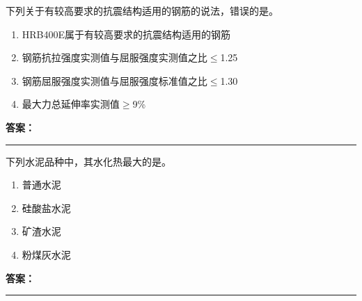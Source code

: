 \documentclass[UTF8,fontset=fandol,11pt]{ctexart}
\newcommand{\answerline}{\textcolor{answerred}{\rule{2.4cm}{0.7pt}}}
\begin{document}
\begin{quizbox}[title={乱序第 15 题｜第四章混凝土结构工程}]

下列关于有较高要求的抗震结构适用的钢筋的说法，错误的是。\\

\begin{enumerate}[label=\Alph*.]

\item HRB400E属于有较高要求的抗震结构适用的钢筋

\item 钢筋抗拉强度实测值与屈服强度实测值之比$\leq$1.25

\item 钢筋屈服强度实测值与屈服强度标准值之比$\leq$1.30

\item 最大力总延伸率实测值$\geq$9\%

\end{enumerate}

\textbf{\textcolor{answerred}{答案：}} \answerline

\end{quizbox}

\vspace{0.2em}

\begin{quizbox}[title={乱序第 16 题｜第四章混凝土结构工程}]

下列水泥品种中，其水化热最大的是。\\

\begin{enumerate}[label=\Alph*.]

\item 普通水泥

\item 硅酸盐水泥

\item 矿渣水泥

\item 粉煤灰水泥

\end{enumerate}

\textbf{\textcolor{answerred}{答案：}} \answerline

\end{quizbox}

\vspace{0.2em}
\end{document}
